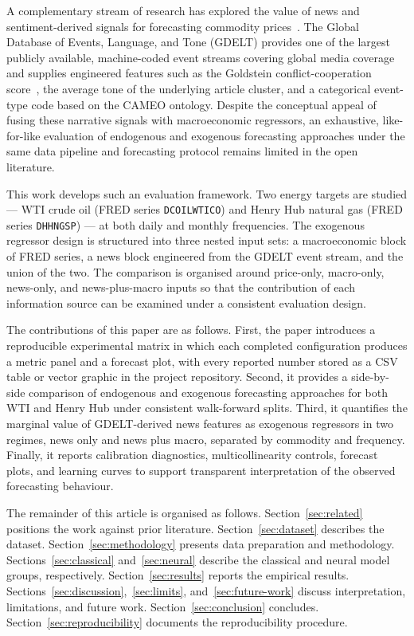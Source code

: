 \documentclass[11pt,a4paper]{article}
\begin{document}
A complementary stream of research has explored the value of news and sentiment-derived signals for forecasting commodity prices~\citep{tetlock2007giving, shapiro2022measuring, baker2016measuring}. The Global Database of Events, Language, and Tone (GDELT) provides one of the largest publicly available, machine-coded event streams covering global media coverage~\citep{leetaru2013gdelt} and supplies engineered features such as the Goldstein conflict-cooperation score~\citep{goldstein1992conflict}, the average tone of the underlying article cluster, and a categorical event-type code based on the CAMEO ontology. Despite the conceptual appeal of fusing these narrative signals with macroeconomic regressors, an exhaustive, like-for-like evaluation of endogenous and exogenous forecasting approaches under the same data pipeline and forecasting protocol remains limited in the open literature.

This work develops such an evaluation framework. Two energy targets are studied --- WTI crude oil (FRED series \texttt{DCOILWTICO}) and Henry Hub natural gas (FRED series \texttt{DHHNGSP}) --- at both daily and monthly frequencies. The exogenous regressor design is structured into three nested input sets: a macroeconomic block of FRED series, a news block engineered from the GDELT event stream, and the union of the two. The comparison is organised around price-only, macro-only, news-only, and news-plus-macro inputs so that the contribution of each information source can be examined under a consistent evaluation design.

The contributions of this paper are as follows. First, the paper introduces a reproducible experimental matrix in which each completed configuration produces a metric panel and a forecast plot, with every reported number stored as a CSV table or vector graphic in the project repository. Second, it provides a side-by-side comparison of endogenous and exogenous forecasting approaches for both WTI and Henry Hub under consistent walk-forward splits. Third, it quantifies the marginal value of GDELT-derived news features as exogenous regressors in two regimes, news only and news plus macro, separated by commodity and frequency. Finally, it reports calibration diagnostics, multicollinearity controls, forecast plots, and learning curves to support transparent interpretation of the observed forecasting behaviour.

The remainder of this article is organised as follows. Section~\ref{sec:related} positions the work against prior literature. Section~\ref{sec:dataset} describes the dataset. Section~\ref{sec:methodology} presents data preparation and methodology. Sections~\ref{sec:classical} and~\ref{sec:neural} describe the classical and neural model groups, respectively. Section~\ref{sec:results} reports the empirical results. Sections~\ref{sec:discussion},~\ref{sec:limits}, and~\ref{sec:future-work} discuss interpretation, limitations, and future work. Section~\ref{sec:conclusion} concludes. Section~\ref{sec:reproducibility} documents the reproducibility procedure.
\end{document}
